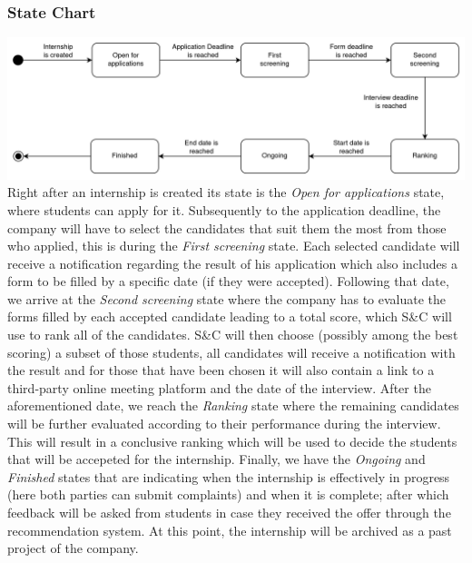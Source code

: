 \documentclass[11pt,twoside]{article}
\begin{document}
		\subsubsection{State Chart}
		\includegraphics[scale=0.185]{Images/Internship_state_diagram} \\
Right after an internship is created its state is the \textit{Open for applications} state, where students can apply for it. Subsequently to the application deadline, the company will have to select the candidates that suit them the most from those who applied, this is during the \textit{First screening} state. Each selected candidate will receive a notification regarding the result of his application which also includes a form to be filled by a specific date (if they were accepted). Following that date, we arrive at the \textit{Second screening} state where the company has to evaluate the forms filled by each accepted candidate leading to a total score, which S\&C will use to rank all of the candidates. S\&C will then choose (possibly among the best scoring) a subset of those students, all candidates will receive a notification with the result and for those that have been chosen it will also contain a link to a third-party online meeting platform and the date of the interview. After the aforementioned date, we reach the \textit{Ranking} state where the remaining candidates will be further evaluated according to their performance during the interview. This will result in a conclusive ranking which will be used to decide the students that will be accepeted for the internship. Finally, we have the \textit{Ongoing} and \textit{Finished} states that are indicating when the internship is effectively in progress (here both parties can submit complaints) and when it is complete; after which feedback will be asked from students in case they received the offer through the recommendation system. At this point, the internship will be archived as a past project of the company.
\end{document}
